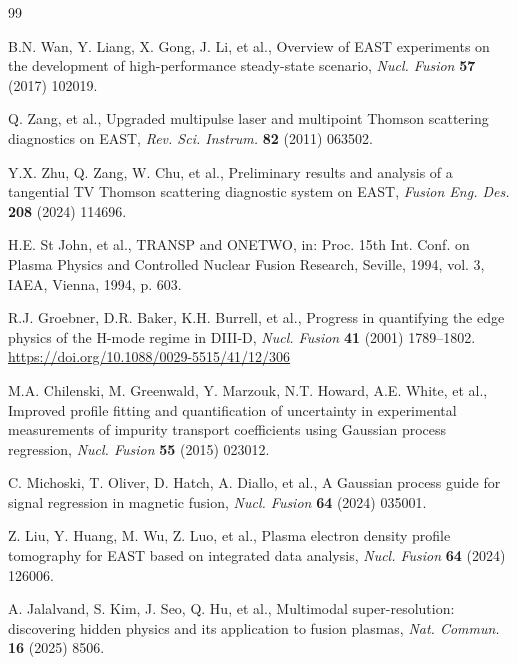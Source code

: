 \documentclass[a4paper,12pt]{article}
\begin{document}
\begin{thebibliography}{99}

B.N. Wan, Y. Liang, X. Gong, J. Li, et al., Overview of EAST experiments on the development of high-performance steady-state scenario, \textit{Nucl. Fusion} \textbf{57} (2017) 102019.

Q. Zang, et al., Upgraded multipulse laser and multipoint Thomson scattering diagnostics on EAST, \textit{Rev. Sci. Instrum.} \textbf{82} (2011) 063502.

Y.X. Zhu, Q. Zang, W. Chu, et al., Preliminary results and analysis of a tangential TV Thomson scattering diagnostic system on EAST, \textit{Fusion Eng. Des.} \textbf{208} (2024) 114696.

H.E. St John, et al., TRANSP and ONETWO, in: Proc. 15th Int. Conf. on Plasma Physics and Controlled Nuclear Fusion Research, Seville, 1994, vol. 3, IAEA, Vienna, 1994, p. 603.

R.J. Groebner, D.R. Baker, K.H. Burrell, et al., Progress in quantifying the edge physics of the H-mode regime in DIII-D, \textit{Nucl. Fusion} \textbf{41} (2001) 1789--1802. \url{https://doi.org/10.1088/0029-5515/41/12/306}

M.A. Chilenski, M. Greenwald, Y. Marzouk, N.T. Howard, A.E. White, et al., Improved profile fitting and quantification of uncertainty in experimental measurements of impurity transport coefficients using Gaussian process regression, \textit{Nucl. Fusion} \textbf{55} (2015) 023012.

C. Michoski, T. Oliver, D. Hatch, A. Diallo, et al., A Gaussian process guide for signal regression in magnetic fusion, \textit{Nucl. Fusion} \textbf{64} (2024) 035001.

Z. Liu, Y. Huang, M. Wu, Z. Luo, et al., Plasma electron density profile tomography for EAST based on integrated data analysis, \textit{Nucl. Fusion} \textbf{64} (2024) 126006.

A. Jalalvand, S. Kim, J. Seo, Q. Hu, et al., Multimodal super-resolution: discovering hidden physics and its application to fusion plasmas, \textit{Nat. Commun.} \textbf{16} (2025) 8506.


\end{thebibliography}
\end{document}
